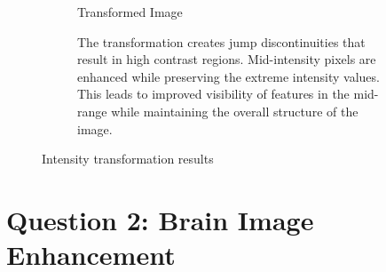 \documentclass[11pt]{article}
\begin{document}
\begin{figure}[H]
\begin{subfigure}{0.3\textwidth}
        \caption{Transformed Image}
    \end{subfigure}
    \hfill
    \begin{subfigure}{0.3\textwidth}
        The transformation creates jump discontinuities that result in high contrast regions. Mid-intensity pixels are enhanced while preserving the extreme intensity values. This leads to improved visibility of features in the mid-range while maintaining the overall structure of the image.

        
    \end{subfigure}
    \caption{Intensity transformation results}
\end{figure}


\section*{Question 2: Brain Image Enhancement}

\end{document}
